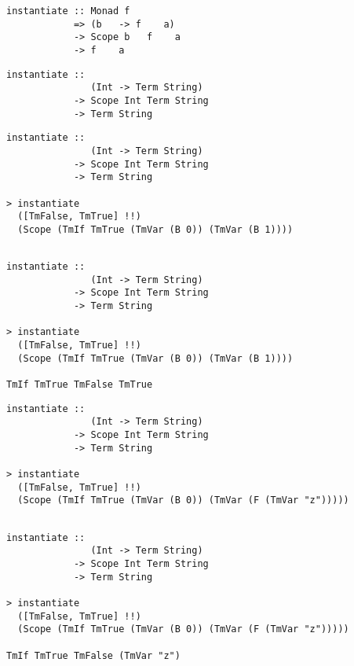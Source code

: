 \documentclass[aspectration=169]{beamer}
\begin{document}
\begin{frame}[fragile]
  \begin{overprint}
  \begin{verbatim}
instantiate :: Monad f 
            => (b   -> f    a) 
            -> Scope b   f    a 
            -> f    a
  \end{verbatim}  
  \begin{verbatim}
instantiate :: 
               (Int -> Term String) 
            -> Scope Int Term String 
            -> Term String

  \end{verbatim}  
  \begin{verbatim}
instantiate :: 
               (Int -> Term String) 
            -> Scope Int Term String 
            -> Term String

> instantiate 
  ([TmFalse, TmTrue] !!) 
  (Scope (TmIf TmTrue (TmVar (B 0)) (TmVar (B 1))))


  \end{verbatim}  
  \begin{verbatim}
instantiate :: 
               (Int -> Term String) 
            -> Scope Int Term String 
            -> Term String

> instantiate 
  ([TmFalse, TmTrue] !!) 
  (Scope (TmIf TmTrue (TmVar (B 0)) (TmVar (B 1))))

TmIf TmTrue TmFalse TmTrue
  \end{verbatim}  
  \begin{verbatim}
instantiate :: 
               (Int -> Term String) 
            -> Scope Int Term String 
            -> Term String

> instantiate 
  ([TmFalse, TmTrue] !!) 
  (Scope (TmIf TmTrue (TmVar (B 0)) (TmVar (F (TmVar "z")))))


  \end{verbatim}  
  \begin{verbatim}
instantiate :: 
               (Int -> Term String) 
            -> Scope Int Term String 
            -> Term String

> instantiate 
  ([TmFalse, TmTrue] !!) 
  (Scope (TmIf TmTrue (TmVar (B 0)) (TmVar (F (TmVar "z")))))

TmIf TmTrue TmFalse (TmVar "z")
  \end{verbatim}  
  \end{overprint}
\end{frame}
\end{document}
